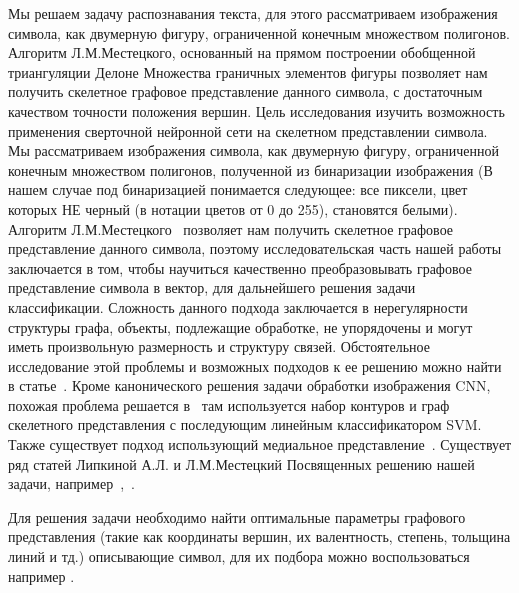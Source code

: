 \documentclass[12pt, twoside]{article}
\begin{document}
Мы решаем задачу распознавания текста, для этого рассматриваем изображения символа, как двумерную фигуру, ограниченной конечным множеством полигонов. Алгоритм Л.М.Местецкого, основанный на прямом построении обобщенной триангуляции Делоне Множества граничных элементов фигуры позволяет нам получить скелетное графовое представление данного символа, с достаточным качеством точности положения вершин.
Цель исследования изучить возможность применения сверточной нейронной сети на скелетном представлении символа. Мы рассматриваем изображения символа, как двумерную фигуру, ограниченной конечным множеством полигонов, полученной из бинаризации изображения (В нашем случае под бинаризацией понимается следующее: все пиксели, цвет которых НЕ черный (в нотации цветов от 0 до 255), становятся белыми). Алгоритм Л.М.Местецкого~\cite{Mestetskiy_alg} позволяет нам получить скелетное графовое представление данного символа, поэтому исследовательская часть нашей работы заключается в том, чтобы научиться качественно преобразовывать графовое представление символа в вектор, для дальнейшего решения задачи классификации.
Сложность данного подхода заключается в нерегулярности структуры графа, объекты, подлежащие обработке, не упорядочены и могут иметь произвольную размерность и структуру связей. Обстоятельное исследование этой проблемы и возможных подходов к ее решению можно найти в статье~\cite{going_beyond_Euclidean_data}. Кроме канонического решения задачи обработки изображения CNN, похожая проблема решается в~\cite{solution_by_SVM_classifier} там используется набор контуров и граф скелетного представления с последующим линейным классификатором SVM. Также существует подход использующий медиальное представление~\cite{solution_by_Medial_Representation_GCNN}. Существует ряд статей Липкиной А.Л. и Л.М.Местецкий Посвященных решению нашей задачи, например~\cite{Lipkina_Mestetskiy_1},~\cite{Lipkina_Mestetskiy_2}.


Для решения задачи необходимо найти оптимальные параметры графового представления (такие как координаты вершин, их валентность, степень, тольщина линий и тд.) описывающие символ, для их подбора можно воспользоваться например \cite{Structural_functional_analisys}.
\end{document}
